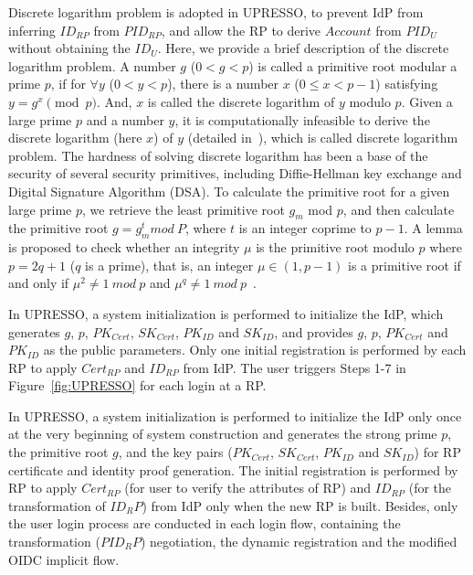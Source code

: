 Discrete logarithm problem is adopted in UPRESSO, to prevent IdP from inferring $ID_{RP}$ from $PID_{RP}$, and allow the RP to derive $Account$ from $PID_U$ without obtaining the $ID_U$.
Here, we provide a brief description of the discrete logarithm problem.
A number $g$ ($0<g<p$) is called a primitive root modular a prime $p$, if for ${\forall}y$ ($0<y<p$), there is a  number $x$ ($0\le x <p-1$) satisfying $y=g^x \pmod p$.
And, $x$ is called the discrete logarithm of $y$ modulo $p$. Given a large prime $p$ and a number $y$, it is computationally infeasible to derive the discrete logarithm (here $x$) of $y$ (detailed in~\cite{WXWM}), which is called discrete logarithm problem. The hardness of solving discrete logarithm has been a base of the security of several security primitives, including Diffie-Hellman key exchange and Digital Signature Algorithm (DSA).
To calculate the primitive root for a given large prime $p$,  we retrieve the least primitive root $g_m$  mod $p$,
and then calculate the primitive root $g = g_{m}^{t} mod \ P$, where $t$ is an integer coprime to $p-1$.
A lemma is proposed to check whether an integrity $\mu$ is the primitive root modulo $p$ where $p=2q+1$ ($q$ is a prime), that is,  an integer $\mu \in (1, p-1)$ is a primitive root if and only if $\mu^2\neq 1 \ mod \ p$ and $\mu^q\neq 1 \ mod \ p$~\cite{Shoup,Wang}.


In UPRESSO, a system initialization is performed to initialize the IdP, which generates $g$, $p$, $PK_{Cert}$, $SK_{Cert}$, $PK_{ID}$ and $SK_{ID}$,
and provides  $g$, $p$, $PK_{Cert}$ and $PK_{ID}$ as the public parameters.
Only one initial registration is performed by each RP to apply  $Cert_{RP}$ and $ID_{RP}$ from IdP.
The user triggers Steps 1-7 in Figure~\ref{fig:UPRESSO} for each login at a RP.

In UPRESSO, a system initialization is performed to initialize the IdP only once at the very beginning of system construction and generates the strong prime $p$, the primitive root $g$, and the key pairs ($PK_{Cert}$, $SK_{Cert}$, $PK_{ID}$ and $SK_{ID}$) for RP certificate and identity proof generation. The initial registration is performed by RP to apply $Cert_{RP}$ (for user to verify the attributes of RP) and $ID_{RP}$ (for the transformation of $ID_RP$) from IdP only when the new RP is built.
Besides, only the user login process are conducted in each login flow, containing the transformation ($PID_RP$) negotiation, the dynamic registration and the modified OIDC implicit flow.


